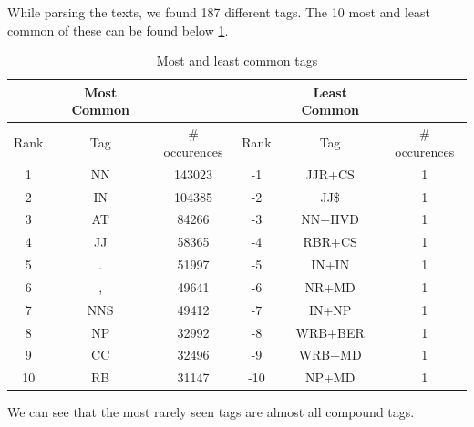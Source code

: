 \documentclass[10pt, a4paper, oneside]{article} %
\begin{document}
While parsing the texts, we found 187 different tags. The 10 most and least common of these can be found below \ref{tags}.
\begin{table}[!h]
\centering
\begin{tabular}{ | c | c | c | | c | c | c | }
\hline
& Most Common & & & Least Common & \\ \hline
Rank & Tag & \# occurences  & Rank & Tag & \# occurences\\ \hline
1 & NN & 143023 & -1 & JJR+CS & 1\\
2 & IN & 104385 & -2 & JJ\$ & 1\\
3 & AT & 84266 & -3 & NN+HVD & 1\\
4 & JJ & 58365 & -4 & RBR+CS & 1\\
5 & . & 51997 & -5 & IN+IN & 1\\
6 & , & 49641 & -6 & NR+MD & 1\\
7 & NNS & 49412 & -7 & IN+NP & 1\\
8 & NP & 32992 & -8 & WRB+BER & 1\\
9 & CC & 32496 & -9 & WRB+MD & 1\\
10 & RB & 31147 & -10 & NP+MD & 1\\ \hline
\end{tabular}
\caption{Most and least common tags}
\label{tags}
\end{table}

We can see that the most rarely seen tags are almost all compound tags.


\pagestyle{fancy} %

\pagebreak
%
%
%
%
%
%
%
%
%
%
%
%
%
%
\end{document}
